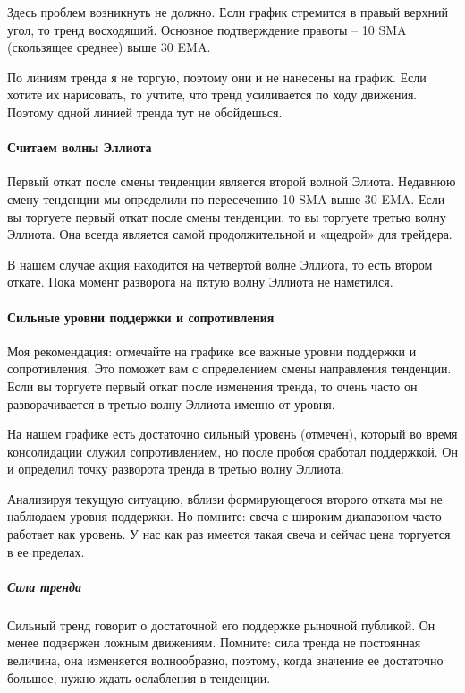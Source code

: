 \documentclass{book}
\begin{document}
Здесь проблем возникнуть не должно. Если график стремится в правый верхний угол, то тренд восходящий. Основное подтверждение правоты – 10 SMA (скользящее среднее) выше 30 EMA.

По линиям тренда я не торгую, поэтому они и не нанесены на
график. Если хотите их нарисовать, то учтите, что тренд усиливается по
ходу движения. Поэтому одной линией тренда тут не обойдешься.

\paragraph{Считаем волны Эллиота}

Первый откат после смены тенденции является второй волной Элиота. Недавнюю смену тенденции мы определили по пересечению 10 SMA выше 30 EMA. Если вы торгуете первый откат после смены тенденции, то вы торгуете третью волну Эллиота. Она всегда является самой продолжительной и «щедрой» для трейдера.

В нашем случае акция находится на четвертой волне Эллиота, то есть
втором откате. Пока момент разворота на пятую волну Эллиота не
наметился.

\paragraph{Сильные уровни поддержки и сопротивления}


Моя рекомендация: отмечайте на графике все важные уровни поддержки и сопротивления. Это поможет вам с определением смены направления тенденции. Если вы торгуете первый откат после изменения тренда, то очень часто он разворачивается в третью волну Эллиота именно от уровня.

На нашем графике есть достаточно сильный уровень (отмечен), который во время консолидации служил сопротивлением, но после пробоя сработал поддержкой. Он и определил точку разворота тренда в третью волну Эллиота.

Анализируя текущую ситуацию, вблизи формирующегося второго отката мы
не наблюдаем уровня поддержки. Но помните: свеча с широким диапазоном
часто работает как уровень. У нас как раз имеется такая свеча и сейчас
цена торгуется в ее пределах.

\subparagraph{Сила тренда}

Сильный тренд говорит о достаточной его поддержке рыночной публикой. Он менее подвержен ложным движениям. Помните: сила тренда не постоянная величина, она изменяется волнообразно, поэтому, когда значение ее достаточно большое, нужно ждать ослабления в тенденции.
\end{document}
